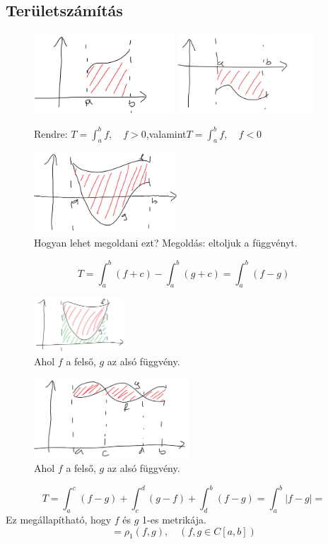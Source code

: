 \documentclass[a4paper,11.5pt]{article}
\begin{document}
	\subsection{Területszámítás}
		\begin{figure}[H]
			\centering
			\includegraphics[height=3cm]{kepek/01.png}
			\includegraphics[height=3cm]{kepek/02.png}
			\caption{Rendre: $T=\int_a^bf,\quad f>0$,\quad valamint\quad  $T=\int_a^bf,\quad f<0$}
		\end{figure}
		
		\begin{figure}[H]
			\centering
			\includegraphics[height=3cm]{kepek/03.png}
			\caption{Hogyan lehet megoldani ezt? Megoldás: eltoljuk a függvényt.}
		\end{figure}
		\[ T=\int_a^b(f+c)-\int_a^b(g+c)=\int_a^b(f-g) \]
		\begin{figure}[H]
			\centering
			\includegraphics[height=2cm]{kepek/04.png}
			\caption{Ahol $f$ a felső, $g$ az alsó függvény.}
		\end{figure}
		\begin{figure}[H]
			\centering
			\includegraphics[height=3cm]{kepek/05.png}
			\caption{Ahol $f$ a felső, $g$ az alsó függvény.}
		\end{figure}
		\[ T=\int_a^c(f-g)+\int_c^d(g-f)+\int_d^b(f-g)=\int_a^b|f-g|= \]
		Ez megállapítható, hogy $f$ és $g$ 1-es metrikája.
		\[ =\rho_1(f,g),\quad (f,g\in C[a,b]) \]
		
\end{document}
